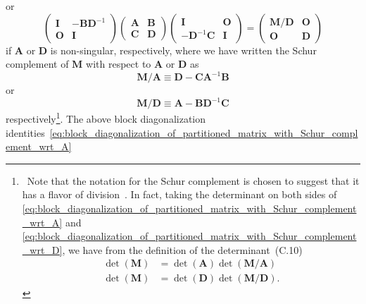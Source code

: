 \documentclass[12pt,a4paper]{article}
\begin{document}
or
\begin{equation}
\begin{pmatrix}
\mathbf{I} & -\mathbf{B}\mathbf{D}^{-1} \\
\mathbf{O} & \mathbf{I}
\end{pmatrix}
\begin{pmatrix}
\mathbf{A} & \mathbf{B} \\
\mathbf{C} & \mathbf{D}
\end{pmatrix}
\begin{pmatrix}
\mathbf{I} & \mathbf{O} \\
-\mathbf{D}^{-1}\mathbf{C} & \mathbf{I}
\end{pmatrix}
=
\begin{pmatrix}
\mathbf{M}/\mathbf{D} & \mathbf{O} \\
\mathbf{O} & \mathbf{D}
\end{pmatrix}
\label{eq:block_diagonalization_of_partitioned_matrix_with_Schur_complement_wrt_D}
\end{equation}
if $\mathbf{A}$ or $\mathbf{D}$ is non-singular, respectively,
where we have written the Schur complement of $\mathbf{M}$ with respect to
$\mathbf{A}$ or $\mathbf{D}$ as
\begin{equation}
\mathbf{M}/\mathbf{A} \equiv \mathbf{D} - \mathbf{C}\mathbf{A}^{-1}\mathbf{B}
\label{eq:Schur_complement_of_M_wrt_A}
\end{equation}
or
\begin{equation}
\mathbf{M}/\mathbf{D} \equiv \mathbf{A} - \mathbf{B}\mathbf{D}^{-1}\mathbf{C}
\label{eq:Schur_complement_of_M_wrt_D}
\end{equation}
respectively\footnote{\
Note that the notation for the Schur complement is chosen to suggest that
it has a flavor of division~\citep{Minka:OldNewMatrixAlgebra}.
In fact, taking the determinant on both sides of
\eqref{eq:block_diagonalization_of_partitioned_matrix_with_Schur_complement_wrt_A} and
\eqref{eq:block_diagonalization_of_partitioned_matrix_with_Schur_complement_wrt_D},
we have from the definition of the determinant~(C.10)
\begin{align}
\operatorname{det}(\mathbf{M}) &=
\operatorname{det}(\mathbf{A}) \operatorname{det}(\mathbf{M}/\mathbf{A}) \\
\operatorname{det}(\mathbf{M}) &=
\operatorname{det}(\mathbf{D}) \operatorname{det}(\mathbf{M}/\mathbf{D}) .
\end{align}
}.
The above block diagonalization
identities~\eqref{eq:block_diagonalization_of_partitioned_matrix_with_Schur_complement_wrt_A}
\end{document}
